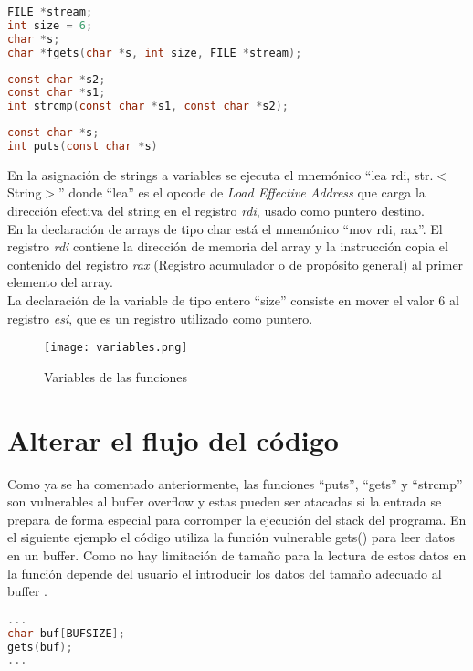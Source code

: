 \documentclass[10pt,a4paper]{article}
\begin{document}
\begin{lstlisting}[language=C]
FILE *stream;
int size = 6;
char *s;
char *fgets(char *s, int size, FILE *stream);
\end{lstlisting}

\begin{lstlisting}[language=C]
const char *s2;
const char *s1;
int strcmp(const char *s1, const char *s2);
\end{lstlisting}

\begin{lstlisting}[language=C]
const char *s;
int puts(const char *s)
\end{lstlisting}

En la asignación de strings a variables se ejecuta el mnemónico ``lea rdi, str.$<$String$>$'' donde ``lea'' es el opcode de \textit{Load Effective Address} que carga la dirección efectiva del string en el registro \textit{rdi}, usado como puntero destino.\\
En la declaración de arrays de tipo char está el mnemónico ``mov rdi, rax''. El registro \textit{rdi} contiene la dirección de memoria del array y la instrucción copia el contenido del registro \textit{rax} (Registro acumulador o de propósito general) al primer elemento del array.\\
La declaración de la variable de tipo entero ``size'' consiste en mover el valor 6 al registro \textit{esi}, que es un registro utilizado como puntero.

\begin{figure}[h!]
  \centering
  \texttt{[image: variables.png]}\\
  \caption{Variables de las funciones}
  \label{fig:variables}
\end{figure}

\section{Alterar el flujo del código}
Como ya se ha comentado anteriormente, las funciones ``puts'', ``gets'' y ``strcmp'' son vulnerables al buffer overflow y estas pueden ser atacadas si la entrada se prepara de forma especial para corromper la ejecución del stack del programa. En el siguiente ejemplo  el código utiliza la función vulnerable gets() para leer datos en un buffer. Como no hay limitación de tamaño para la lectura de estos datos en la función depende del usuario el introducir los datos del tamaño adecuado al buffer \cite{buffer_overflow2}.

\begin{lstlisting}[language=C]
...
char buf[BUFSIZE];
gets(buf);
...
\end{lstlisting}
\end{document}
